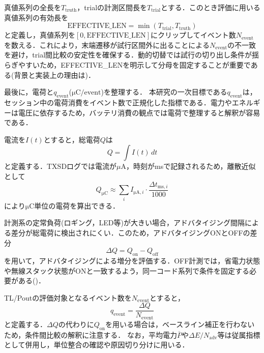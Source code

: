 真値系列の全長を$T_{\mathrm{truth}}$，trialの計測区間長を$T_{\mathrm{trial}}$とする．このとき評価に用いる真値系列の有効長を
\begin{equation}
  \mathrm{EFFECTIVE\_LEN}=\min(T_{\mathrm{trial}},T_{\mathrm{truth}})
\end{equation}
と定義し，真値系列を$[0,\mathrm{EFFECTIVE\_LEN}]$にクリップしてイベント数$N_{\mathrm{event}}$を数える．これにより，末端遷移が試行区間外に出ることによる$N_{\mathrm{event}}$の不一致を避け，trial間比較の安定性を確保する．動的切替では試行の切り出し条件が揺らぎやすいため，EFFECTIVE\_LENを明示して分母を固定することが重要である(背景と実装上の理由は)．

最後に，\texorpdfstring{電荷と$q_{\mathrm{event}}$($\si{\micro\coulomb}/\text{event}$)}{電荷とq_event(uC/event)}を整理する．
本研究の一次目標である$q_{\mathrm{event}}$は，セッション中の電荷消費をイベント数で正規化した指標である．電力やエネルギーは電圧に依存するため，バッテリ消費の観点では電荷で整理すると解釈が容易である．

電流を$I(t)$とすると，総電荷$Q$は
\begin{equation}
  Q=\int I(t)\,dt
\end{equation}
と定義する．TXSDログでは電流が$\mu$A，時刻がmsで記録されるため，離散近似として
\begin{equation}
  Q_{\si{\micro\coulomb}} \approx \sum_{i} I_{\si{\micro\ampere},i}\cdot \frac{\Delta t_{\si{\milli\second},i}}{1000}
\end{equation}
により$\si{\micro\coulomb}$単位の電荷を算出できる．

計測系の定常負荷(ロギング，LED等)が大きい場合，アドバタイジング間隔による差分が総電荷に検出されにくい．このため，アドバタイジングONとOFFの差分
\begin{equation}
  \Delta Q = Q_{\mathrm{on}}-Q_{\mathrm{off}}
\end{equation}
を用いて，アドバタイジングによる増分を評価する．OFF計測では，省電力状態や無線スタック状態がONと一致するよう，同一コード系列で条件を固定する必要がある()．

TL/Poutの評価対象となるイベント数を$N_{\mathrm{event}}$とすると，
\begin{equation}
  q_{\mathrm{event}}=\frac{\Delta Q}{N_{\mathrm{event}}}
\end{equation}
と定義する．$\Delta Q$の代わりに$Q_{\mathrm{on}}$を用いる場合は，ベースライン補正を行わないため，条件間比較の解釈に注意する．
なお，平均電力$\overline{P}$や$\Delta E/N_{\mathrm{adv}}$等は従属指標として併用し，単位整合の確認や原因切り分けに用いる．








